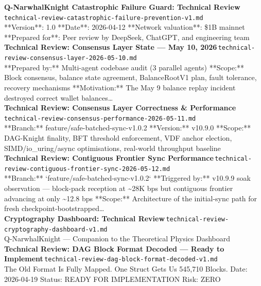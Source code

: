 \documentclass[11pt,a4paper]{article}
\begin{document}
\noindent\textbf{Q-NarwhalKnight Catastrophic Failure Guard: Technical Review}\,\textcolor{qgray}{\small \texttt{technical-review-catastrophic-failure-prevention-v1.md}}\\
**Version**: 1.0 **Date**: 2026-04-12 **Network valuation**: \$1B mainnet **Prepared for**: Peer review by DeepSeek, ChatGPT, and engineering team\\[6pt]
\noindent\textbf{Technical Review: Consensus Layer State --- May 10, 2026}\,\textcolor{qgray}{\small \texttt{technical-review-consensus-layer-2026-05-10.md}}\\
**Prepared by:** Multi-agent codebase audit (3 parallel agents) **Scope:** Block consensus, balance state agreement, BalanceRootV1 plan, fault tolerance, recovery mechanisms **Motivation:** The May 9 balance replay incident destroyed correct wallet balances\ldots{}\\[6pt]
\noindent\textbf{Technical Review: Consensus Layer Correctness \& Performance}\,\textcolor{qgray}{\small \texttt{technical-review-consensus-performance-2026-05-11.md}}\\
**Branch:** feature/safe-batched-sync-v1.0.2 **Version:** v10.9.0 **Scope:** DAG-Knight finality, BFT threshold enforcement, VDF anchor election, SIMD/io\_uring/async optimisations, real-world throughput baseline\\[6pt]
\noindent\textbf{Technical Review: Contiguous Frontier Sync Performance}\,\textcolor{qgray}{\small \texttt{technical-review-contiguous-frontier-sync-2026-05-12.md}}\\
**Branch:** `feature/safe-batched-sync-v1.0.2` **Triggered by:** v10.9.9 soak observation --- block-pack reception at \textasciitilde{}28K bps but contiguous frontier advancing at only \textasciitilde{}12.8 bps **Scope:** Architecture of the initial-sync path for fresh checkpoint-bootstrapped\ldots{}\\[6pt]
\noindent\textbf{Cryptography Dashboard: Technical Review}\,\textcolor{qgray}{\small \texttt{technical-review-cryptography-dashboard-v1.md}}\\
Q-NarwhalKnight --- Companion to the Theoretical Physics Dashboard\\[6pt]
\noindent\textbf{Technical Review: DAG Block Format Decoded --- Ready to Implement}\,\textcolor{qgray}{\small \texttt{technical-review-dag-block-format-decoded-v1.md}}\\
The Old Format Is Fully Mapped. One Struct Gets Us 545,710 Blocks. Date: 2026-04-19 \textbar{} Status: READY FOR IMPLEMENTATION \textbar{} Risk: ZERO\\[6pt]
\end{document}
